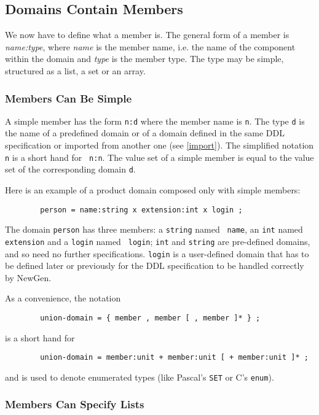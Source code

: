 \subsection{Domains Contain Members}

We now have to define what a member is. The general form of a member is
{\em name:type}, where {\em name} is the member name, i.e.  the name of
the component within the domain and {\em type} is the member type. The
type may be simple, structured as a list, a set or an array.

\subsubsection*{Members Can Be Simple}

A simple member has the form {\tt n:d} where the member name is {\tt n}.
The type {\tt d} is the name of a predefined domain or of a domain
defined in the same DDL specification or imported from another one (see
\ref{import}). The simplified notation {\tt n} is a short hand for {\tt
n:n}.  The value set of a simple member is equal to the value set of the
corresponding domain {\tt d}.

Here is an example of a product domain composed only with simple members:
\begin{verbatim}
        person = name:string x extension:int x login ;
\end{verbatim}
The domain {\tt person} has three members: a {\tt string} named {\tt
name}, an {\tt int} named {\tt extension} and a {\tt login} named {\tt
login}; {\tt int} and {\tt string} are pre-defined domains, and so need
no further specifications. {\tt login} is a user-defined domain that has
to be defined later or previously for the DDL specification to be
handled correctly by NewGen.

As a convenience, the notation 
\begin{verbatim}
        union-domain = { member , member [ , member ]* } ;
\end{verbatim}
is a short hand for 
\begin{verbatim}
        union-domain = member:unit + member:unit [ + member:unit ]* ;
\end{verbatim}
and is used to denote enumerated types (like Pascal's {\tt SET} or C's
{\tt enum}).

\subsubsection*{Members Can Specify Lists}

